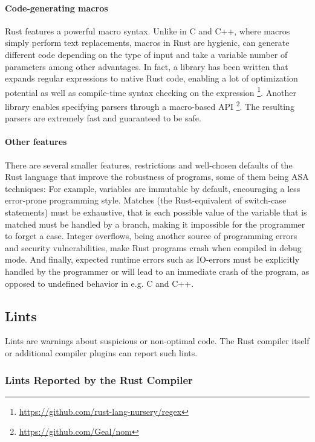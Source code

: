 \documentclass{scrartcl}
\begin{document}
\paragraph{Code-generating macros} Rust features a powerful macro syntax. Unlike in C and C++, where macros simply perform text replacements, macros in Rust are hygienic, can generate different code depending on the type of input and take a variable number of parameters among other advantages. In fact, a library has been written that expands regular expressions to native Rust code, enabling a lot of optimization potential as well as compile-time syntax checking on the expression \footnote{\url{https://github.com/rust-lang-nursery/regex}}. Another library enables specifying parsers through a macro-based API \footnote{\url{https://github.com/Geal/nom}}. The resulting parsers are extremely fast and guaranteed to be safe.

\paragraph{Other features} There are several smaller features, restrictions and well-chosen defaults of the Rust language that improve the robustness of programs, some of them being ASA techniques: For example, variables are immutable by default, encouraging a less error-prone programming style. Matches (the Rust-equivalent of switch-case statements) must be exhaustive, that is each possible value of the variable that is matched must be handled by a branch, making it impossible for the programmer to forget a case. Integer overflows, being another source of programming errors and security vulnerabilities, make Rust programs crash when compiled in debug mode. And finally, expected runtime errors such as IO-errors must be explicitly handled by the programmer or will lead to an immediate crash of the program, as opposed to undefined behavior in e.g. C and C++.


\subsection{Lints}

Lints are warnings about suspicious or non-optimal code. The Rust compiler itself or additional compiler plugins can report such lints.

\subsubsection{Lints Reported by the Rust Compiler}
\end{document}
